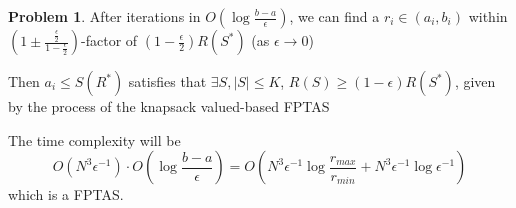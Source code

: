 \documentclass[a4paper]{article}
\theoremstyle{definition}
\newtheorem{problem}{Problem}
\theoremstyle{plain}
\numberwithin{equation}{problem}
\begin{document}
\begin{problem}
    After iterations in  $ O(\log \frac{b-a}{\epsilon}) $, we can find a  $ r_i\in (a_i,b_i) $ within  $ (1\pm \frac{\frac{\epsilon}{2}}{1-\frac{\epsilon}{2}}) $-factor of  $ (1-\frac{\epsilon}{2})R(S^*) $ (as  $ \epsilon\rightarrow 0 $)  

    Then  $ a_i \leq S(R^*) $ satisfies that  $ \exists S, |S| \leq K $,  $ R(S) \geq (1-\epsilon)R(S^*) $, given by the process of the knapsack valued-based FPTAS

    The time complexity will be 
    \[O(N^3\epsilon^{-1})\cdot O(\log\frac{b-a}{\epsilon})=O(N^3\epsilon^{-1}\log\frac{r_{max}}{r_{min}}+N^3\epsilon^{-1}\log\epsilon^{-1})\]
    which is a FPTAS.

    
\end{problem}
\end{document}
